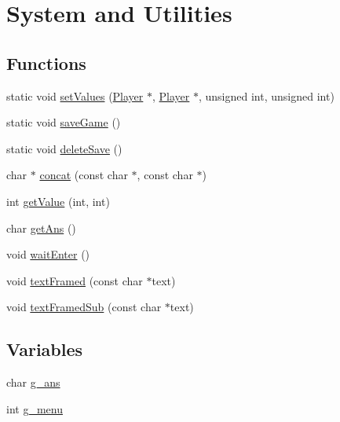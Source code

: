\hypertarget{group__system}{}\section{System and Utilities}
\label{group__system}
\subsection*{Functions}
\begin{DoxyCompactItemize}
\item 
static void \hyperlink{group__system_ga1ad5b76589358eed58f97d25e63591ce}{set\+Values} (\hyperlink{group__game_gac6f795d0d2e88ee469ddc704329e7cc3}{Player} $\ast$, \hyperlink{group__game_gac6f795d0d2e88ee469ddc704329e7cc3}{Player} $\ast$, unsigned int, unsigned int)
\item 
static void \hyperlink{group__system_gac42f6d85eb40dfdfadbf9933d885b4c1}{save\+Game} ()
\item 
static void \hyperlink{group__system_ga64ff5e40fc2d7ff1139ef10c5598f123}{delete\+Save} ()
\item 
char $\ast$ \hyperlink{group__system_ga2ec60b27c8c3eeedecc5a8f2d311d90d}{concat} (const char $\ast$, const char $\ast$)
\item 
int \hyperlink{group__system_ga8c7f7faf9cadfc15f2518a2508442fe1}{get\+Value} (int, int)
\item 
char \hyperlink{group__system_ga8e246608287303651a79bf1e940502ab}{get\+Ans} ()
\item 
void \hyperlink{group__system_gac403fa21ccf75b7ec08e5dbdeafbfc04}{wait\+Enter} ()
\item 
void \hyperlink{group__system_ga6bf4df1581f8838ed8735026ca64828b}{text\+Framed} (const char $\ast$text)
\item 
void \hyperlink{group__system_gaa2cdcb51e7e5ba8b7e2162e2966e39ab}{text\+Framed\+Sub} (const char $\ast$text)
\end{DoxyCompactItemize}
\subsection*{Variables}
\begin{DoxyCompactItemize}
\item 
char \hyperlink{group__system_gaf046b2323d4aa2925386328d45029271}{g\+\_\+ans}
\item 
int \hyperlink{group__system_ga9e0d209810483b5853d1a8215eb45f03}{g\+\_\+menu}
\end{DoxyCompactItemize}


